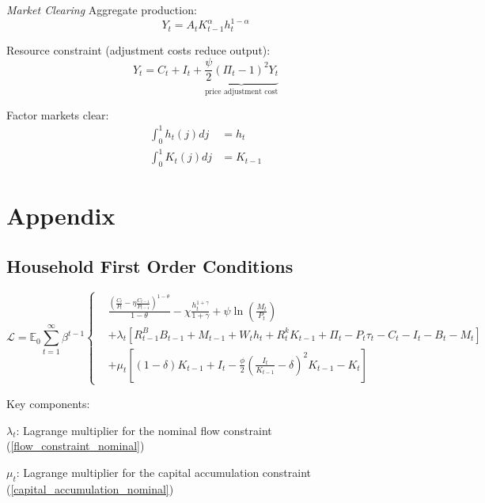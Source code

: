 \documentclass[11pt,preprint]{elsarticle}
\numberwithin{equation}{section}
\numberwithin{figure}{section}
\numberwithin{table}{section}
\begin{document}
\emph{Market Clearing} Aggregate production: \begin{equation}
Y_t = A_t K_{t-1}^{\alpha} h_t^{1-\alpha}
\label{aggregate_production}
\end{equation}

Resource constraint (adjustment costs reduce output): \begin{equation}
Y_t = C_t + I_t + \underbrace{\frac{\psi}{2} (\Pi_t - 1)^2 Y_t}_{\text{price adjustment cost}}
\label{resource_constraint}
\end{equation}

Factor markets clear: \begin{align}
\int_0^1 h_t(j) dj &= h_t \\
\int_0^1 K_t(j) dj &= K_{t-1}
\end{align}

\newpage
\newpage

\section{Appendix}\label{appendix}

\subsection{\texorpdfstring{Household First Order Conditions
\label{household_FOC}}{Household First Order Conditions }}\label{household-first-order-conditions}

\begin{equation}
\mathcal{L} = \mathbb{E}_0 \sum_{t=1}^{\infty} \beta^{t-1} 
\left\{
\begin{aligned}
& \frac{\left( \frac{C_t}{P_t} - \eta \frac{C_{t-1}}{P_{t-1}} \right)^{1-\theta}}{1-\theta} 
- \chi \frac{h_t^{1+\gamma}}{1+\gamma} 
+ \psi \ln \left( \frac{M_t}{P_t} \right) \\
& + \lambda_t \left[ R^B_{t-1} B_{t-1} + M_{t-1} + W_t h_t + R^k_t K_{t-1} + \Pi_t - P_t \tau_t - C_t - I_t - B_t - M_t \right] \\
& + \mu_t \left[ (1 - \delta) K_{t-1} + I_t - \frac{\phi}{2} \left( \frac{I_t}{K_{t-1}} - \delta \right)^2 K_{t-1} - K_t \right]
\end{aligned}
\right.
\end{equation}

Key components:

\(\lambda_t\): Lagrange multiplier for the nominal flow constraint
(\ref{flow_constraint_nominal})

\(\mu_t\): Lagrange multiplier for the capital accumulation constraint
(\ref{capital_accumulation_nominal})
\end{document}
